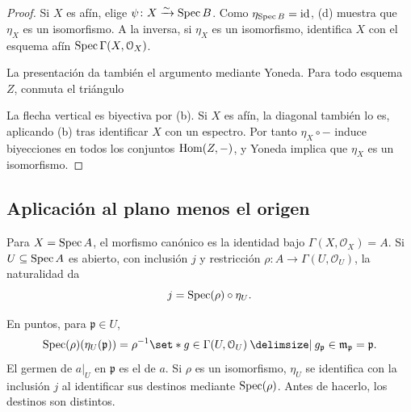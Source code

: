 \begin{proof}
Si $X$ es afín, elige $\psi\colon X\xrightarrow{\sim}\operatorname{Spec} B$. Como $\eta_{\operatorname{Spec} B}=\operatorname{id}$, (d) muestra que $\eta_X$ es un isomorfismo. A la inversa, si $\eta_X$ es un isomorfismo, identifica $X$ con el esquema afín $\operatorname{Spec}\Gamma(X,\mathcal O_X)$.

La presentación da también el argumento mediante Yoneda. Para todo esquema $Z$, conmuta el triángulo
\begin{center}
\end{center}
La flecha vertical es biyectiva por (b). Si $X$ es afín, la diagonal también lo es, aplicando (b) tras identificar $X$ con un espectro. Por tanto $\eta_X\circ-$ induce biyecciones en todos los conjuntos $\operatorname{Hom}(Z,-)$, y Yoneda implica que $\eta_X$ es un isomorfismo.
\end{proof}

\subsection{Aplicación al plano menos el origen}

\begin{obs}
\label{obs:s08-canonico-identidad-inclusion}
Para $X=\operatorname{Spec} A$, el morfismo canónico es la identidad bajo $\Gamma(X,\mathcal O_X)=A$. Si $U\subseteq\operatorname{Spec} A$ es abierto, con inclusión $j$ y restricción $\rho\colon A\to\Gamma(U,\mathcal O_U)$, la naturalidad da
\[
j=\operatorname{Spec}(\rho)\circ\eta_U.
\]
\end{obs}
\begin{center}
\end{center}
En puntos, para $\mathfrak p\in U$,
\[
\Spec(\rho)(\eta_U(\mathfrak p))
=\rho^{-1}\set*{g\in\Gamma(U,\mathcal O_U)\given g_{\mathfrak p}\in\mathfrak m_{\mathfrak p}}
=\mathfrak p.
\]
El germen de $a|_U$ en $\mathfrak p$ es el de $a$. Si $\rho$ es un isomorfismo, $\eta_U$ se identifica con la inclusión $j$ al identificar sus destinos mediante $\operatorname{Spec}(\rho)$. Antes de hacerlo, los destinos son distintos.

